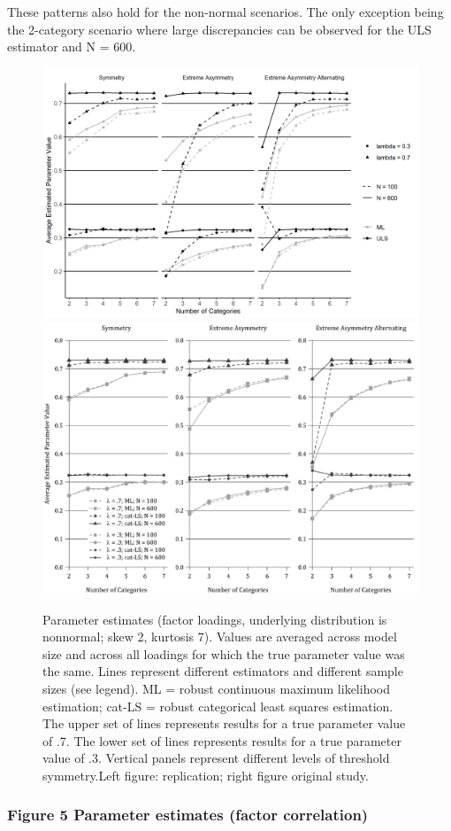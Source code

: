 \documentclass[10,a4paperpaper,]{article}
\begin{document}
These patterns also hold for the non-normal scenarios. The only
exception being the 2-category scenario where large discrepancies can be
observed for the ULS estimator and N = 600.

\begin{figure}
\includegraphics[width=0.49\linewidth]{./figures/fig_4} \includegraphics[width=0.49\linewidth]{./figures/fig4_original} \caption{Parameter estimates (factor loadings, underlying distribution is nonnormal; skew 2, kurtosis 7). Values are averaged across model size and across all loadings for which the true parameter value was the same. Lines represent different estimators and different sample sizes (see legend). ML = robust continuous maximum likelihood estimation; cat-LS = robust categorical least squares estimation. The upper set of lines represents results for a true parameter value of .7. The lower set of lines represents results for a true parameter value of .3. Vertical panels represent different levels of threshold symmetry.Left figure: replication; right figure original study.}\label{fig:fig4}
\end{figure}

\subsubsection{Figure 5 Parameter estimates (factor correlation)}
\end{document}
